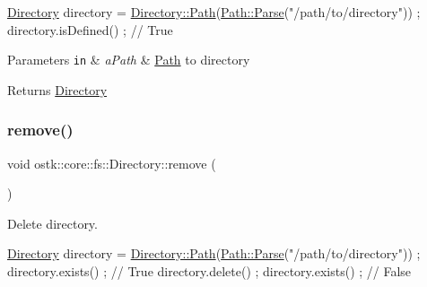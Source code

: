 \begin{DoxyCode}
\hyperlink{classostk_1_1core_1_1fs_1_1_directory_adc893e10f55282be0d0455e9cfc5796b}{Directory} directory = \hyperlink{classostk_1_1core_1_1fs_1_1_directory_a0151dba2940d5f426b52209dc7dab2e5}{Directory::Path}(\hyperlink{classostk_1_1core_1_1fs_1_1_path_ad08539ba654f5df11c4bcb07276345ad}{Path::Parse}(\textcolor{stringliteral}{"/path/to/directory"}))
       ;
directory.isDefined() ; \textcolor{comment}{// True}
\end{DoxyCode}



\begin{DoxyParams}[1]{Parameters}
\mbox{\tt in}  & {\em a\+Path} & \hyperlink{classostk_1_1core_1_1fs_1_1_path}{Path} to directory \\
\hline
\end{DoxyParams}
\begin{DoxyReturn}{Returns}
\hyperlink{classostk_1_1core_1_1fs_1_1_directory}{Directory} 
\end{DoxyReturn}
\mbox{\label{classostk_1_1core_1_1fs_1_1_directory_a268a93961419f0418613b2d1baa5e71c}} 
\subsubsection{\texorpdfstring{remove()}{remove()}}
{\footnotesize\ttfamily void ostk\+::core\+::fs\+::\+Directory\+::remove (\begin{DoxyParamCaption}{ }\end{DoxyParamCaption})}



Delete directory. 


\begin{DoxyCode}
\hyperlink{classostk_1_1core_1_1fs_1_1_directory_adc893e10f55282be0d0455e9cfc5796b}{Directory} directory = \hyperlink{classostk_1_1core_1_1fs_1_1_directory_a0151dba2940d5f426b52209dc7dab2e5}{Directory::Path}(\hyperlink{classostk_1_1core_1_1fs_1_1_path_ad08539ba654f5df11c4bcb07276345ad}{Path::Parse}(\textcolor{stringliteral}{"/path/to/directory"}))
       ;
directory.exists() ; \textcolor{comment}{// True}
directory.delete() ;
directory.exists() ; \textcolor{comment}{// False}
\end{DoxyCode}
 \mbox{\label{classostk_1_1core_1_1fs_1_1_directory_ae71a158b5efa776be263679b2b69bd26}} 
